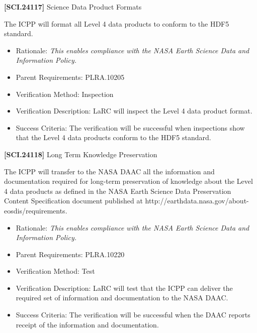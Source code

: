 \textbf{[SCI.24117]} Science Data Product Formats

The \gls{ICPP} will format all Level 4 data products to conform to the HDF5 standard.

\begin{itemize}
\item{} Rationale: \emph{This enables compliance with the NASA Earth Science Data and Information Policy.}

\item{} Parent Requirements: PLRA.10205

\item{} Verification Method: Inspection

\item{} Verification Description: \gls{LaRC} will inspect the Level 4 data product format.

\item{} Success Criteria: The verification will be successful when \gls{inspection}s show that the Level 4 data products conform to the HDF5 standard.

\end{itemize}

\textbf{[SCI.24118]} Long Term Knowledge Preservation

The \gls{ICPP} will transfer to the NASA \gls{DAAC} all the information and documentation required for long-term preservation of knowledge about the Level 4 data products as defined in the NASA Earth Science Data Preservation Content Specification document published at http:\slash \slash earthdata.nasa.gov\slash about-eosdis\slash requirements.

\begin{itemize}
\item{} Rationale: \emph{This enables compliance with the NASA Earth Science Data and Information Policy.}

\item{} Parent Requirements: PLRA.10220

\item{} Verification Method: Test

\item{} Verification Description: \gls{LaRC} will \gls{test} that the \gls{ICPP} can deliver the required set of information and documentation to the NASA \gls{DAAC}.

\item{} Success Criteria: The verification will be successful when the \gls{DAAC} reports receipt of the information and documentation.

\end{itemize}

